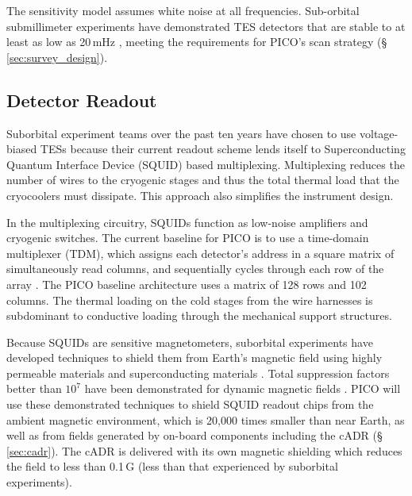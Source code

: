The sensitivity model assumes white noise at all frequencies. Sub-orbital submillimeter experiments have demonstrated TES detectors that are stable to at least as low as 20\,mHz \citep{Rahlin2014}, meeting the requirements for PICO's scan strategy (\S\,\ref{sec:survey_design}). 

\subsection{Detector Readout}
\label{sec:detector_readout} %

Suborbital experiment teams over the past ten years have chosen to use voltage-biased TESs because their current readout scheme lends itself to Superconducting Quantum Interface Device (SQUID) based multiplexing. Multiplexing reduces the number of wires to the cryogenic stages and thus the total thermal load that the cryocoolers must dissipate. This approach also simplifies the instrument design.  

In the multiplexing circuitry, SQUIDs function as low-noise amplifiers and cryogenic switches. The current baseline for PICO is to use a time-domain multiplexer (TDM), which assigns each detector's address in a square matrix of simultaneously read columns, and sequentially cycles through each row of the array \citep{Henderson2016}. The PICO baseline architecture uses a matrix of 128 rows and 102 columns. 
The thermal loading on the cold stages from the wire harnesses is subdominant to conductive loading through the mechanical support structures.  

Because SQUIDs are sensitive magnetometers, suborbital experiments
have developed techniques to shield them from Earth's magnetic field
using highly permeable materials and superconducting materials
\citep{Hui2018}.  Total suppression factors better than $10^7$ have
been demonstrated for dynamic magnetic fields \citep{Runyan2010}. PICO
will use these demonstrated techniques to shield SQUID readout chips
from the ambient magnetic environment, which is 20,000 times smaller
than near Earth, as well as from fields generated by on-board
components including the cADR (\S\,\ref{sec:cadr}). The cADR is
delivered with its own magnetic shielding which reduces the field to
less than 0.1\,G (less than that experienced by suborbital
experiments).

